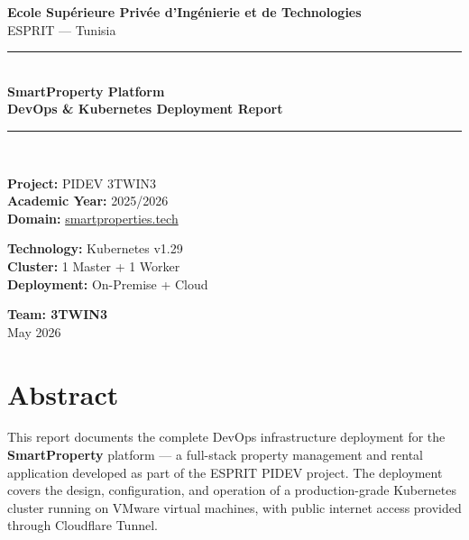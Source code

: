\documentclass[12pt,a4paper]{report}
\begin{document}
\begin{titlepage}
  \centering
  \vspace*{1cm}

  {\Large\textbf{Ecole Supérieure Privée d'Ingénierie et de Technologies}}\\[0.3cm]
  {\large ESPRIT --- Tunisia}\\[2cm]

  \rule{\linewidth}{0.5mm}\\[0.4cm]
  {\Huge\bfseries\color{primaryblue} SmartProperty Platform}\\[0.3cm]
  {\LARGE\bfseries DevOps \& Kubernetes Deployment Report}\\[0.2cm]
  \rule{\linewidth}{0.5mm}\\[1.5cm]

  \begin{minipage}{0.45\textwidth}
    \begin{flushleft}
      \textbf{Project:} PIDEV 3TWIN3\\
      \textbf{Academic Year:} 2025/2026\\
      \textbf{Domain:} \href{https://smartproperties.tech}{smartproperties.tech}
    \end{flushleft}
  \end{minipage}
  \hfill
  \begin{minipage}{0.45\textwidth}
    \begin{flushright}
      \textbf{Technology:} Kubernetes v1.29\\
      \textbf{Cluster:} 1 Master + 1 Worker\\
      \textbf{Deployment:} On-Premise + Cloud
    \end{flushright}
  \end{minipage}

  \vfill

  {\large\textbf{Team: 3TWIN3}}\\[0.5cm]
  {\large May 2026}

\end{titlepage}

\chapter*{Abstract}

This report documents the complete DevOps infrastructure deployment for the \textbf{SmartProperty} platform --- a full-stack property management and rental application developed as part of the ESPRIT PIDEV project. The deployment covers the design, configuration, and operation of a production-grade Kubernetes cluster running on VMware virtual machines, with public internet access provided through Cloudflare Tunnel.
\end{document}
